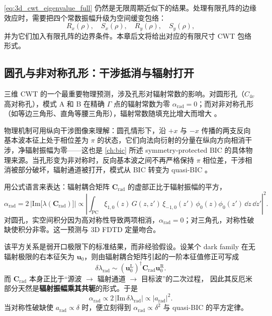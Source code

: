\cref{eq:3d_cwt_eigenvalue_full} 仍然是无限周期近似下的结果。处理有限孔阵的边缘效应时，需要把四个常数振幅升级为空间缓变包络：
\[
R_x(\rho),\quad S_x(\rho),\quad R_y(\rho),\quad S_y(\rho),
\]
并为它们加入有限孔阵的边界条件。本章后文将给出对应的有限尺寸 CWT 包络形式。

\subsection{圆孔与非对称孔形：干涉抵消与辐射打开}

三维 CWT 的一个最重要物理预测，涉及孔形对辐射常数的影响。对圆形孔（$C_{4v}$ 高对称孔），模式 A 和 B 在精确 $\Gamma$ 点的辐射常数为零 $\alpha_{\mathrm{rad}}=0$；而对非对称孔形（如等边三角形、直角等腰三角形），辐射常数随填充比增大而增大 \cite{liang2012square}。

物理机制可用纵向干涉图像来理解：圆孔情形下，沿 $+x$ 与 $-x$ 传播的两支反向基本波本征上处于相位差为 $\pi$ 的状态，它们向法向衍射的分量在纵向方向相消干涉，净辐射振幅为零——这也是 \cref{ch:bic} 所述 symmetry-protected BIC 的具体物理来源。当孔形变为非对称时，反向基本波之间不再严格保持 $\pi$ 相位差，干涉相消被部分破坏，辐射通道被打开，模式从 BIC 转变为 quasi-BIC \cite{liang2012square}。

用公式语言来表达：辐射耦合矩阵 $\bm{C}_{\mathrm{rad}}$ 的虚部正比于辐射振幅的平方，
\begin{equation}
\alpha_{\mathrm{rad}} = 2\,\left|\mathrm{Im}\bigl[\lambda(\bm{C}_{\mathrm{rad}})\bigr]\right| \propto \left|\int_{\mathrm{PC}} \xi_{1,0}(z)\,G(z,z')\,\xi_{-1,0}(z')\,\phi_0(z)\phi_0(z')\,\dd z\,\dd z'\right|^2.
\label{eq:alpha_rad_circle_vs_triangle}
\end{equation}
对圆孔，实空间积分因为高对称性导致两项相消，$\alpha_{\mathrm{rad}}=0$；对三角孔，对称性破缺使积分非零。这一预测与 3D FDTD 定量吻合\cite{liang2012square}。

该平方关系是弱开口极限下的标准结果，而非经验假设。设某个 dark family 在无辐射极限的右本征矢为
$\bm u_0$，则由辐射耦合矩阵引起的一阶本征值修正可写成
\[
\delta\lambda_{\mathrm{rad}}
\sim
(\bm u_0^{\mathrm L})^\dagger
\bm C_{\mathrm{rad}}
\bm u_0^{\mathrm R}.
\]
而 $\bm C_{\mathrm{rad}}$ 本身正比于“源波 $\to$ 辐射通道 $\to$ 目标波”的二次过程，
因此其反厄米部分天然是\textbf{辐射振幅乘其共轭}的形式。于是
\[
\alpha_{\mathrm{rad}}
\propto
2\,\left|\mathrm{Im}\,\delta\lambda_{\mathrm{rad}}\right|
\propto
|a_{\mathrm{rad}}|^2.
\]
当对称性破缺使 $a_{\mathrm{rad}}\propto \delta$ 时，便立刻得到
$\alpha_{\mathrm{rad}}\propto \delta^2$ 与 quasi-BIC 的平方定律。

